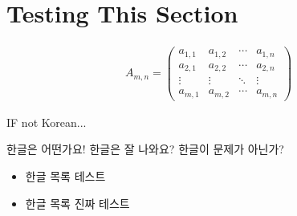 \documentclass{article}
\begin{document}

\section{Testing This Section}

\begin{align}
A_{m,n} = 
 \begin{pmatrix}
  a_{1,1} & a_{1,2} & \cdots & a_{1,n} \\
  a_{2,1} & a_{2,2} & \cdots & a_{2,n} \\
  \vdots  & \vdots  & \ddots & \vdots  \\
  a_{m,1} & a_{m,2} & \cdots & a_{m,n} 
 \end{pmatrix}
\end{align}

IF not Korean... 

한글은 어떤가요! 한글은 잘 나와요? 
한글이 문제가 아닌가? 

\begin{itemize}
    \item 한글 목록 테스트 
    \item 한글 목록 진짜 테스트 
\end{itemize}
\end{document}
